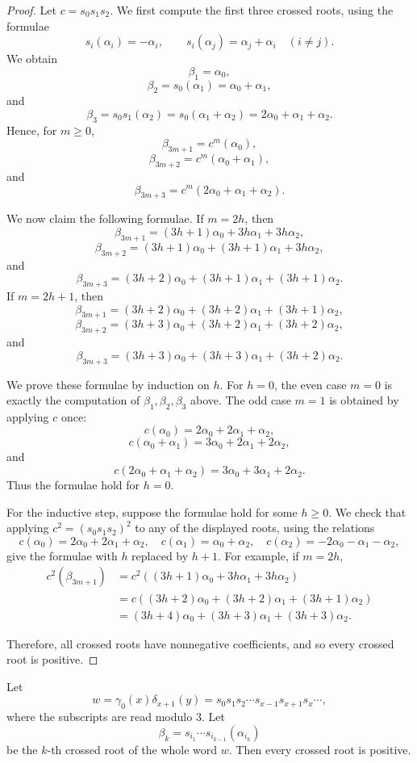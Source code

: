 \documentclass[11pt]{article}
\begin{document}
\begin{proof}
Let $c=s_0s_1s_2$. We first compute the first three crossed roots, using the formulae
\[
s_i(\alpha_i)=-\alpha_i,
\qquad
s_i(\alpha_j)=\alpha_j+\alpha_i
\quad (i\neq j).
\]
We obtain
\[
\beta_1=\alpha_0,
\]
\[
\beta_2=s_0(\alpha_1)=\alpha_0+\alpha_1,
\]
and
\[
\beta_3=s_0s_1(\alpha_2)
=s_0(\alpha_1+\alpha_2)
=2\alpha_0+\alpha_1+\alpha_2.
\]
Hence, for $m\geq 0$,
\[
\beta_{3m+1}=c^m(\alpha_0),
\]
\[
\beta_{3m+2}=c^m(\alpha_0+\alpha_1),
\]
and
\[
\beta_{3m+3}=c^m(2\alpha_0+\alpha_1+\alpha_2).
\]

We now claim the following formulae. If $m=2h$, then
\[
\beta_{3m+1}=(3h+1)\alpha_0+3h\alpha_1+3h\alpha_2,
\]
\[
\beta_{3m+2}=(3h+1)\alpha_0+(3h+1)\alpha_1+3h\alpha_2,
\]
and
\[
\beta_{3m+3}=(3h+2)\alpha_0+(3h+1)\alpha_1+(3h+1)\alpha_2.
\]
If $m=2h+1$, then
\[
\beta_{3m+1}=(3h+2)\alpha_0+(3h+2)\alpha_1+(3h+1)\alpha_2,
\]
\[
\beta_{3m+2}=(3h+3)\alpha_0+(3h+2)\alpha_1+(3h+2)\alpha_2,
\]
and
\[
\beta_{3m+3}=(3h+3)\alpha_0+(3h+3)\alpha_1+(3h+2)\alpha_2.
\]

We prove these formulae by induction on $h$. For $h=0$, the even case $m=0$ is exactly the computation of $\beta_1,\beta_2,\beta_3$ above. The odd case $m=1$ is obtained by applying $c$ once:
\[
c(\alpha_0)=2\alpha_0+2\alpha_1+\alpha_2,
\]
\[
c(\alpha_0+\alpha_1)=3\alpha_0+2\alpha_1+2\alpha_2,
\]
and
\[
c(2\alpha_0+\alpha_1+\alpha_2)=3\alpha_0+3\alpha_1+2\alpha_2.
\]
Thus the formulae hold for $h=0$.

For the inductive step, suppose the formulae hold for some $h\geq 0$. 
We check that applying $c^2=(s_0s_1s_2)^2$ to any of the displayed roots, using the relations
\[c(\alpha_0)=2\alpha_0+2\alpha_1+\alpha_2,\quad c(\alpha_1)=\alpha_0+\alpha_2,\quad c(\alpha_2)=-2\alpha_0-\alpha_1-\alpha_2,\] give the formulae with $h$ replaced by $h+1$. For example, if $m=2h$,
\begin{align*}c^2(\beta_{3m+1})&=c^2((3h+1)\alpha_0+3h\alpha_1+3h\alpha_2)\\&=c((3h+2)\alpha_0+(3h+2)\alpha_1+(3h+1)\alpha_2)\\&= (3h+4)\alpha_0+(3h+3)\alpha_1+(3h+3)\alpha_2.\end{align*}

Therefore, all crossed roots have nonnegative coefficients, and
so every crossed root is positive. 
\end{proof}

\begin{lemma}
Let
\[
w=\gamma_0(x)\delta_{x+1}(y)=s_0s_1s_2\cdots s_{x-1} s_{x+1}s_{x}\cdots,
\]
where the subscripts are read modulo $3$. Let
\[
\beta_k=s_{i_1}\cdots s_{i_{k-1}}(\alpha_{i_k})
\]
be the $k$-th crossed root of the whole word $w$. Then every crossed root is positive.
\end{lemma}
\end{document}
